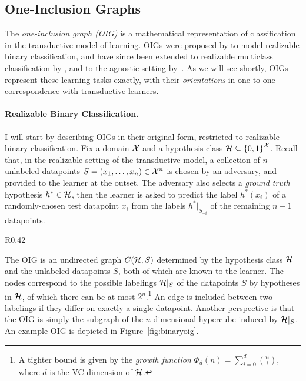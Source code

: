 \subsection{One-Inclusion Graphs}
\label{sec:oig}

The \emph{one-inclusion graph (OIG)} is a mathematical representation of classification in the transductive model of learning. OIGs were proposed by  \citet{haussler_predicting_1994} to model  realizable binary classification, and have since been  extended to realizable multiclass classification by \citet{rubinstein_shifting_2009}, and  to the agnostic setting by~\citet{asilis_regularization_2024}. As we will see shortly, OIGs represent these learning tasks exactly, with their \emph{orientations} in one-to-one correspondence with transductive learners. 

\paragraph{Realizable Binary Classification.} I will start by describing OIGs in their original form, restricted to realizable binary classification. Fix a domain $\mathcal{X}$ and a hypothesis class $\mathcal{H} \subseteq \left\{ 0,1 \right\}^{\mathcal{X}}$. Recall that, in the  realizable setting of the transductive model, a collection of $n$  unlabeled datapoints $S=(x_1,\ldots,x_n) \in \mathcal{X}^n$ is chosen by an adversary, and provided to the learner at the outset. The adversary also selects a \emph{ground truth} hypothesis $h^* \in \mathcal{H}$,  then the learner is asked to predict the label $h^*(x_i)$ of a randomly-chosen test datapoint $x_i$ from the labels $h^*|_{S_{-i}}$ of the remaining $n-1$ datapoints.


\begin{wrapfigure}{R}{0.42\textwidth}
  \centering
  
  \caption{Example OIG for realizable binary classification on three~datapoints.}
  \label{fig:binaryoig}
\end{wrapfigure}
The OIG is an undirected graph $G(\mathcal{H},S)$  determined by the hypothesis class $\mathcal{H}$ and the unlabeled datapoints  $S$, both of which are known to the learner. The nodes correspond to the possible labelings $\mathcal{H}|_S$  of the datapoints $S$ by hypotheses in $\mathcal{H}$, of which there can be at most $2^n$.\footnote{A tighter bound is given by the \emph{growth function} $\Phi_d(n) = \sum_{i=0}^d \binom{n}{i}$, where $d$ is the VC dimension of $\mathcal{H}$.} %
  An edge is included between two labelings if they differ on exactly a single datapoint. Another perspective is that the OIG is simply the subgraph of the $n$-dimensional hypercube induced by $\mathcal{H}|_S$. An example OIG is depicted in Figure~\ref{fig:binaryoig}.


